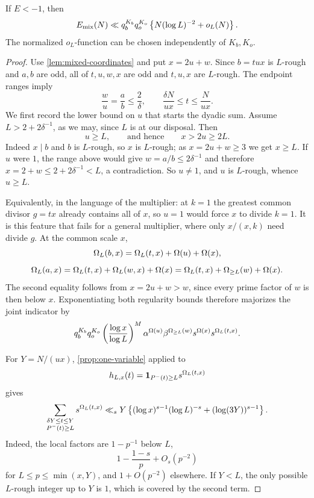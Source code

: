 \documentclass[11pt]{article}
\begin{document}
\begin{proposition}\label{prop:mixed-estimate}
If \(E<-1\), then
\begin{equation}\label{eq:mixed-final}
 E_{\rm mix}(N)
 \ll q_b^{K_b}q_o^{K_o}
 \left\{N(\log L)^{-2}+o_L(N)\right\}.
\end{equation}
The normalized \(o_L\)-function can be chosen independently of
\(K_b,K_o\).
\end{proposition}

\begin{proof}
Use \cref{lem:mixed-coordinates} and put \(x=2u+w\). Since \(b=tux\) is
\(L\)-rough and \(a,b\) are odd, all of \(t,u,w,x\) are odd and
\(t,u,x\) are \(L\)-rough. The endpoint ranges imply
\[
 \frac wu=\frac ab\leq\frac2\delta,
\qquad
 \frac{\delta N}{ux}\leq t\leq\frac{N}{ux}.
\]
We first record the lower bound on \(u\) that starts the dyadic sum. Assume
\(L>2+2\delta^{-1}\), as we may, since \(L\) is at our disposal. Then
\begin{equation}\label{eq:block-lower}
 u\geq L,\qquad\text{and hence}\qquad x>2u\geq2L .
\end{equation}
Indeed \(x\mid b\) and \(b\) is \(L\)-rough, so \(x\) is \(L\)-rough; as
\(x=2u+w\geq3\) we get \(x\geq L\). If \(u\) were \(1\), the range above would
give \(w=a/b\leq2\delta^{-1}\) and therefore
\(x=2+w\leq2+2\delta^{-1}<L\), a contradiction. So \(u\neq1\), and \(u\) is
\(L\)-rough, whence \(u\geq L\).

Equivalently, in the language of the multiplier: at \(k=1\) the greatest
common divisor \(g=tx\) already contains all of \(x\), so \(u=1\) would force
\(x\) to divide \(k=1\). It is this feature that fails for a general
multiplier, where only \(x/(x,k)\) need divide \(g\).
At the common scale \(x\),
\[
 \Omega_L(b,x)=\Omega_L(t,x)+\Omega(u)+\Omega(x),
\]
\begin{equation}\label{eq:a-anatomy}
 \Omega_L(a,x)=\Omega_L(t,x)+\Omega_L(w,x)+\Omega(x)
 =\Omega_L(t,x)+\Omega_{\geq L}(w)+\Omega(x).
\end{equation}
The second equality follows from \(x=2u+w>w\), since every prime factor of
\(w\) is then below \(x\). Exponentiating both regularity bounds therefore
majorizes the joint indicator by
\begin{equation}\label{eq:mixed-indicator}
 q_b^{K_b}q_o^{K_o}
 \left(\frac{\log x}{\log L}\right)^M
 \alpha^{\Omega(u)}
 \beta^{\Omega_{\geq L}(w)}
 s^{\Omega(x)}
 s^{\Omega_L(t,x)}.
\end{equation}

For \(Y=N/(ux)\), \cref{prop:one-variable} applied to
\[
 h_{L,x}(t)=\mathbf 1_{P^-(t)\geq L}s^{\Omega_L(t,x)}
\]
gives
\begin{equation}\label{eq:mixed-residual}
 \sum_{\substack{\delta Y\leq t\leq Y\\P^-(t)\geq L}}
 s^{\Omega_L(t,x)}
 \ll_s
 Y\left\{
  (\log x)^{s-1}(\log L)^{-s}
  +(\log(3Y))^{s-1}
 \right\}.
\end{equation}
Indeed, the local factors are \(1-p^{-1}\) below \(L\),
\[
 1-\frac{1-s}{p}+O_s(p^{-2})
\]
for \(L\leq p\leq\min(x,Y)\), and \(1+O(p^{-2})\) elsewhere. If \(Y<L\),
the only possible \(L\)-rough integer up to \(Y\) is \(1\), which is covered
by the second term.


\end{proof}
\end{document}
